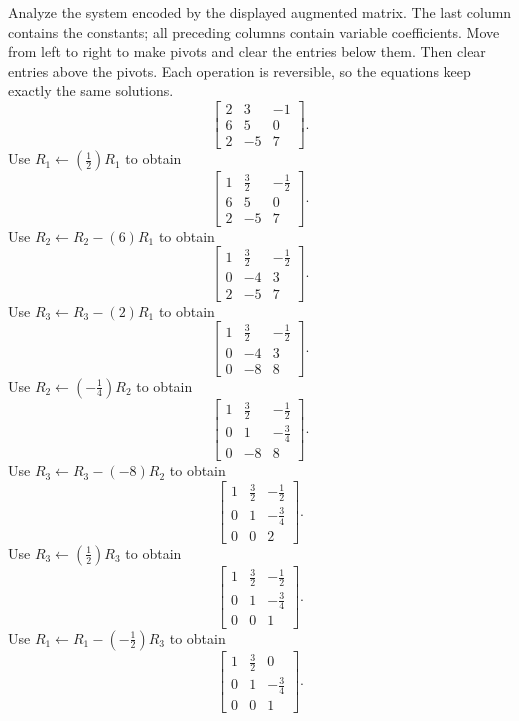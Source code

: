 \goal Analyze the system encoded by the displayed augmented matrix. The last column contains the constants; all preceding columns contain variable coefficients.
\idea Move from left to right to make pivots and clear the entries below them. Then clear entries above the pivots. Each operation is reversible, so the equations keep exactly the same solutions.
\[ \left[\begin{array}{rr|r}2&3&-1\\6&5&0\\2&-5&7\end{array}\right].\]
Use $R_{1}\leftarrow(\frac{1}{2})R_{1}$ to obtain
\[ \left[\begin{array}{rr|r}1&\frac{3}{2}&- \frac{1}{2}\\6&5&0\\2&-5&7\end{array}\right].\]
Use $R_{2}\leftarrow R_{2}-(6)R_{1}$ to obtain
\[ \left[\begin{array}{rr|r}1&\frac{3}{2}&- \frac{1}{2}\\0&-4&3\\2&-5&7\end{array}\right].\]
Use $R_{3}\leftarrow R_{3}-(2)R_{1}$ to obtain
\[ \left[\begin{array}{rr|r}1&\frac{3}{2}&- \frac{1}{2}\\0&-4&3\\0&-8&8\end{array}\right].\]
Use $R_{2}\leftarrow(- \frac{1}{4})R_{2}$ to obtain
\[ \left[\begin{array}{rr|r}1&\frac{3}{2}&- \frac{1}{2}\\0&1&- \frac{3}{4}\\0&-8&8\end{array}\right].\]
Use $R_{3}\leftarrow R_{3}-(-8)R_{2}$ to obtain
\[ \left[\begin{array}{rr|r}1&\frac{3}{2}&- \frac{1}{2}\\0&1&- \frac{3}{4}\\0&0&2\end{array}\right].\]
Use $R_{3}\leftarrow(\frac{1}{2})R_{3}$ to obtain
\[ \left[\begin{array}{rr|r}1&\frac{3}{2}&- \frac{1}{2}\\0&1&- \frac{3}{4}\\0&0&1\end{array}\right].\]
Use $R_{1}\leftarrow R_{1}-(- \frac{1}{2})R_{3}$ to obtain
\[ \left[\begin{array}{rr|r}1&\frac{3}{2}&0\\0&1&- \frac{3}{4}\\0&0&1\end{array}\right].\]
